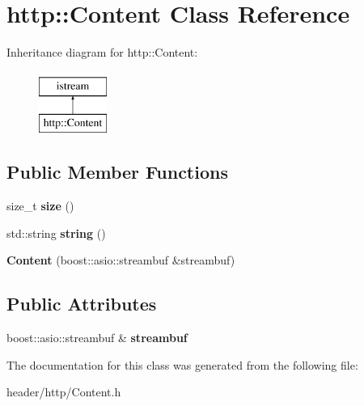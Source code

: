 \hypertarget{classhttp_1_1_content}{}\section{http\+:\+:Content Class Reference}
\label{classhttp_1_1_content}
Inheritance diagram for http\+:\+:Content\+:\begin{figure}[H]
\begin{center}
\leavevmode
\includegraphics[height=2.000000cm]{dd/d5f/classhttp_1_1_content}
\end{center}
\end{figure}
\subsection*{Public Member Functions}
\begin{DoxyCompactItemize}
\item 
\mbox{\label{classhttp_1_1_content_a5a39199b9f8c05ac3c7a4088ee255c5f}} 
size\+\_\+t {\bfseries size} ()
\item 
\mbox{\label{classhttp_1_1_content_af57d45e4b9f4ea12e238a0b9cf7e23e5}} 
std\+::string {\bfseries string} ()
\item 
\mbox{\label{classhttp_1_1_content_a6e7c7b674b76873a64afe380cb0dd11a}} 
{\bfseries Content} (boost\+::asio\+::streambuf \&streambuf)
\end{DoxyCompactItemize}
\subsection*{Public Attributes}
\begin{DoxyCompactItemize}
\item 
\mbox{\label{classhttp_1_1_content_a0157e071440455dc1a0f59e1f0824b70}} 
boost\+::asio\+::streambuf \& {\bfseries streambuf}
\end{DoxyCompactItemize}


The documentation for this class was generated from the following file\+:\begin{DoxyCompactItemize}
\item 
header/http/Content.\+h\end{DoxyCompactItemize}
